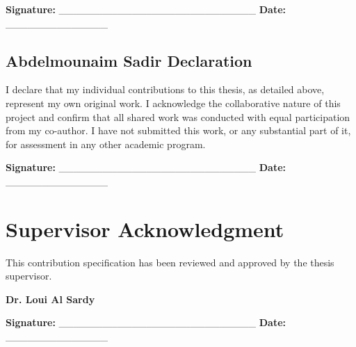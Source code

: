 \textbf{Signature:} \_\_\_\_\_\_\_\_\_\_\_\_\_\_\_\_\_\_\_\_\_\_\_\_\_\_\_ \textbf{Date:} \_\_\_\_\_\_\_\_\_\_\_\_\_\_

\subsection{Abdelmounaim Sadir Declaration}
I declare that my individual contributions to this thesis, as detailed above, represent my own original work. I acknowledge the collaborative nature of this project and confirm that all shared work was conducted with equal participation from my co-author. I have not submitted this work, or any substantial part of it, for assessment in any other academic program.

\textbf{Signature:} \_\_\_\_\_\_\_\_\_\_\_\_\_\_\_\_\_\_\_\_\_\_\_\_\_\_\_ \textbf{Date:} \_\_\_\_\_\_\_\_\_\_\_\_\_\_

\section{Supervisor Acknowledgment}

This contribution specification has been reviewed and approved by the thesis supervisor.

\textbf{Dr. Loui Al Sardy}

\textbf{Signature:} \_\_\_\_\_\_\_\_\_\_\_\_\_\_\_\_\_\_\_\_\_\_\_\_\_\_\_ \textbf{Date:} \_\_\_\_\_\_\_\_\_\_\_\_\_\_


